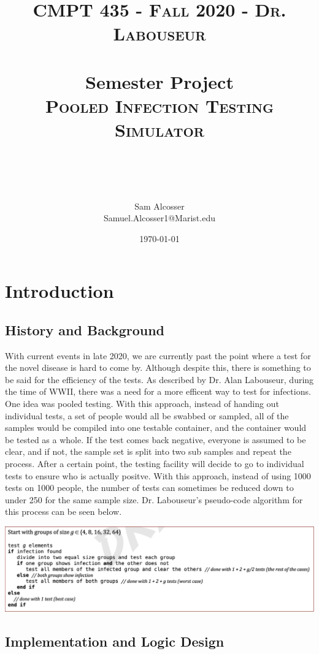 \documentclass[letterpaper, 10pt]{article}
\title{	
   \normalfont \normalsize 
   \textsc{CMPT 435 - Fall 2020 - Dr. Labouseur} \\[10pt] %
   \horrule{0.5pt} \\[0.25cm] 	%
   \large{Semester Project} \\
   \textsc{Pooled Infection Testing Simulator}\\[20pt]%
 \author{Sam Alcosser \\ \normalsize Samuel.Alcosser1@Marist.edu}
   \horrule{0.5pt} \\ 	%
   


  
\date{\normalsize\today} 
}
\begin{document}
\selectfont
\maketitle
\tableofcontents
\newpage




\section{Introduction}

\subsection{History and Background}

With current events in late 2020, we are currently past the point where a test for the novel disease is hard to come by. Although despite this, there is something to be said for the efficiency of the tests. As described by Dr. Alan Labouseur, during the time of WWII, there was a need for a more efficent way to test for infections. One idea was pooled testing. With this approach, instead of handing out individual tests, a set of people would all be swabbed or sampled, all of the samples would be compiled into one testable container, and the container would be tested as a whole. If the test comes back negative, everyone is assumed to be clear, and if not, the sample set is split into two sub samples and repeat the process. After a certain point, the testing facility will decide to go to individual tests to ensure who is actually positve. With this approach, instead of using 1000 tests on 1000 people, the number of tests can sometimes be reduced down to under 250 for the same sample size. Dr. Labouseur's pseudo-code algorithm for this process can be seen below.

\begin{center}
 \includegraphics[width=\textwidth ]{pooled testing.JPG}
 \end{center}
 
\subsection{Implementation and Logic Design}
\end{document}
